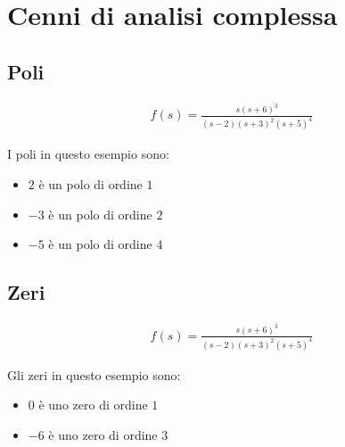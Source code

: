 \chapter{Cenni di analisi complessa}


\section{Poli}

\begin{align}
  f(s) = \frac{s(s+6)^3}{(s-2)(s+3)^2(s+5)^4}
\end{align}

I poli in questo esempio sono:
\begin{itemize}
  \item $2$ \`e un polo di ordine $1$
  \item $-3$ \`e un polo di ordine $2$
  \item $-5$ \`e un polo di ordine $4$
\end{itemize}

\section{Zeri}

\begin{align}
  f(s) = \frac{s(s+6)^3}{(s-2)(s+3)^2(s+5)^4}
\end{align}

Gli zeri in questo esempio sono:
\begin{itemize}
  \item $0$ \`e uno zero di ordine $1$
  \item $-6$ \`e uno zero di ordine $3$
\end{itemize}
